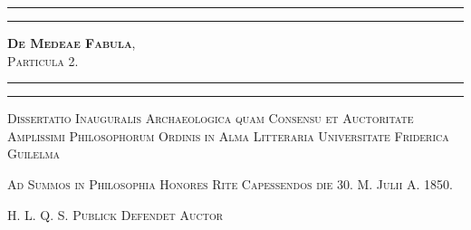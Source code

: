 \documentclass[a4paper, 11pt, oneside, polutonikogreek, german]{article}
\begin{document}
\renewcommand\thefootnote{{\color{BlueViolet}{\arabic{footnote}}}}
\let\oldfootnote\footnote
    \renewcommand{\footnote}[1]{\oldfootnote{{\color{BlueViolet}#1}}}
\begin{titlepage} %
	\centering %

	
	\rule{\textwidth}{1.6pt}\vspace*{-\baselineskip}\vspace*{2pt} %
	\rule{\textwidth}{0.4pt} %
	
	\vspace{1\baselineskip} %
	
	{\scshape\Huge \textbf{De Medeae Fabula},\\ \Large Particula 2.}
	
	\vspace{1\baselineskip} %

	\rule{\textwidth}{0.4pt}\vspace*{-\baselineskip}\vspace{3.2pt} %
	\rule{\textwidth}{1.6pt} %
	
	\vspace{1\baselineskip} %
	
	
	{\scshape \large Dissertatio Inauguralis Archaeologica quam Consensu et Auctoritate Amplissimi Philosophorum Ordinis in Alma Litteraria Universitate Friderica Guilelma}
 
        \vspace{0.5\baselineskip}
        
        {\scshape \small Ad Summos in Philosophia Honores Rite Capessendos die 30. M. Julii A. 1850.}

        \vspace{0.5\baselineskip}
        
        {\scshape \scriptsize H. L. Q. S. Publick Defendet Auctor} %
	
	\vspace*{1\baselineskip} %
	

\end{titlepage}
\end{document}

